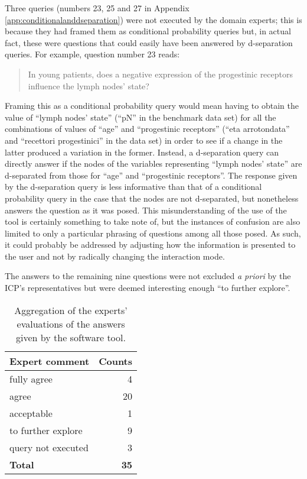 Three queries (numbers 23, 25 and 27 in Appendix \ref{app:conditionalanddseparation}) were not executed by the domain experts; this is because they had framed them as conditional probability queries but, in actual fact, these were questions that could easily have been answered by d-separation queries.
For example, question number 23 reads:
\begin{quotation}
	In young patients, does a negative expression of the progestinic receptors influence the lymph nodes' state?
\end{quotation}
Framing this as a conditional probability query would mean having to obtain the value of \enquote{lymph nodes' state} (\enquote{pN} in the benchmark data set) for all the combinations of values of \enquote{age} and \enquote{progestinic receptors} (\enquote{eta arrotondata} and \enquote{recettori progestinici} in the data set) in order to see if a change in the latter produced a variation in the former.
Instead, a d-separation query can directly answer if the nodes of the variables representing \enquote{lymph nodes' state} are d-separated from those for \enquote{age} and \enquote{progestinic receptors}.
The response given by the d-separation query is less informative than that of a conditional probability query in the case that the nodes are not d-separated, but nonetheless answers the question as it was posed.
This misunderstanding of the use of the tool is certainly something to take note of, but the instances of confusion are also limited to only a particular phrasing of questions among all those posed.
As such, it could probably be addressed by adjusting how the information is presented to the user and not by radically changing the interaction mode.

The answers to the remaining nine questions were not excluded \textit{a priori} by the ICP's representatives but were deemed interesting enough \enquote{to further explore}.

\begin{table}[h]
	\centering
	\caption{Aggregation of the experts' evaluations of the answers given by the software tool.}
	\begin{tabularx}{0.7\textwidth}{Xr}
		\toprule
		Expert comment & Counts  \\
		\midrule	
		fully agree & 4 \\
		agree & 20 \\
		acceptable & 1 \\
		to further explore & 9 \\
		query not executed & 3 \\	
		\midrule
		\textbf{Total} & \textbf{35} \\
		\bottomrule
		\end{tabularx}
	\label{tab:recapquestionsresult}
\end{table}

